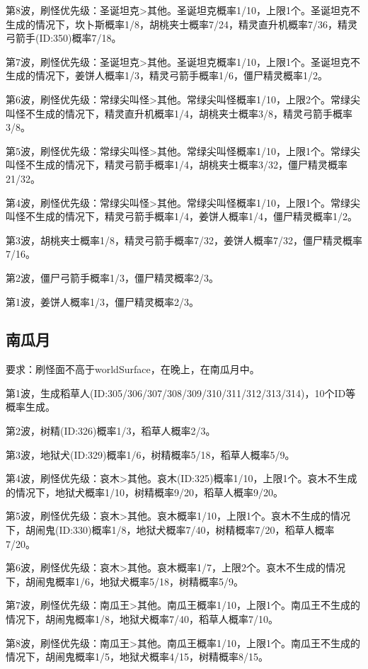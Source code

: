第8波，刷怪优先级：圣诞坦克>其他。圣诞坦克概率1/10，上限1个。圣诞坦克不生成的情况下，坎卜斯概率1/8，胡桃夹士概率7/24，精灵直升机概率7/36，精灵弓箭手(ID:350)概率7/18。

第7波，刷怪优先级：圣诞坦克>其他。圣诞坦克概率1/10，上限1个。圣诞坦克不生成的情况下，姜饼人概率1/3，精灵弓箭手概率1/6，僵尸精灵概率1/2。

第6波，刷怪优先级：常绿尖叫怪>其他。常绿尖叫怪概率1/10，上限2个。常绿尖叫怪不生成的情况下，精灵直升机概率1/4，胡桃夹士概率3/8，精灵弓箭手概率3/8。

第5波，刷怪优先级：常绿尖叫怪>其他。常绿尖叫怪概率1/10，上限1个。常绿尖叫怪不生成的情况下，精灵弓箭手概率1/4，胡桃夹士概率3/32，僵尸精灵概率21/32。

第4波，刷怪优先级：常绿尖叫怪>其他。常绿尖叫怪概率1/10，上限1个。常绿尖叫怪不生成的情况下，精灵弓箭手概率1/4，姜饼人概率1/4，僵尸精灵概率1/2。

第3波，胡桃夹士概率1/8，精灵弓箭手概率7/32，姜饼人概率7/32，僵尸精灵概率7/16。

第2波，僵尸弓箭手概率1/3，僵尸精灵概率2/3。

第1波，姜饼人概率1/3，僵尸精灵概率2/3。

\subsection{南瓜月}
要求：刷怪面不高于worldSurface，在晚上，在南瓜月中。

第1波，生成稻草人(ID:305/306/307/308/309/310/311/312/313/314)，10个ID等概率生成。

第2波，树精(ID:326)概率1/3，稻草人概率2/3。

第3波，地狱犬(ID:329)概率1/6，树精概率5/18，稻草人概率5/9。

第4波，刷怪优先级：哀木>其他。哀木(ID:325)概率1/10，上限1个。哀木不生成的情况下，地狱犬概率1/10，树精概率9/20，稻草人概率9/20。

第5波，刷怪优先级：哀木>其他。哀木概率1/10，上限1个。哀木不生成的情况下，胡闹鬼(ID:330)概率1/8，地狱犬概率7/40，树精概率7/20，稻草人概率7/20。

第6波，刷怪优先级：哀木>其他。哀木概率1/7，上限2个。哀木不生成的情况下，胡闹鬼概率1/6，地狱犬概率5/18，树精概率5/9。

第7波，刷怪优先级：南瓜王>其他。南瓜王概率1/10，上限1个。南瓜王不生成的情况下，胡闹鬼概率1/8，地狱犬概率7/40，稻草人概率7/10。

第8波，刷怪优先级：南瓜王>其他。南瓜王概率1/10，上限1个。南瓜王不生成的情况下，胡闹鬼概率1/5，地狱犬概率4/15，树精概率8/15。

